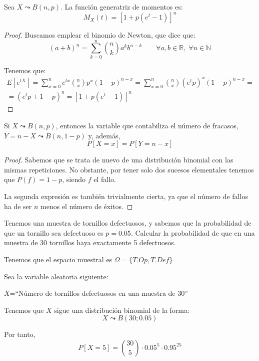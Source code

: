 \begin{prop} Sea $X\leadsto B(n,p)$.
La función generatriz de momentos es:
    $$M_X(t) = [1 + p(e^t - 1)]^n$$
\end{prop}
\begin{proof}
    Buscamos emplear el binomio de Newton, que dice que:
    \begin{equation*}
        (a+b)^n = \sum_{k=0}^n \binom{n}{k} a^kb^{n-k} \qquad \forall a,b\in \mathbb{R}, \;\forall n\in \mathbb{N}
    \end{equation*}

    Tenemos que:
    \begin{multline*}
        E[e^{tX}] = \sum_{x=0}^n e^{tx}\binom{n}{x}p^x(1-p)^{n-x}
        = \sum_{x=0}^n \binom{n}{x}(e^tp)^x(1-p)^{n-x}
        =\\= (e^tp +1-p)^n = [1+p(e^t-1)]^n
    \end{multline*}
\end{proof}


\begin{prop}[Simetría]
    Si $X\leadsto B(n,p)$, entonces la variable que contabiliza el número de fracasos, $Y=n-X \leadsto B(n, 1-p)$ y, además,
    \begin{equation*}
        P[X=x] = P[Y=n-x]
    \end{equation*}
\end{prop}
\begin{proof}
    Sabemos que se trata de nuevo de una distribución binomial con las mismas repeticiones. No obstante, por tener solo dos sucesos elementales tenemos que $P(f)=1-p$, siendo $f$ el fallo.

    La segunda expresión es también trivialmente cierta, ya que el número de fallos ha de ser $n$ menos el número de éxitos.
\end{proof}

\begin{ejemplo}
    Tenemos una muestra de tornillos defectuosos, y sabemos que la probabilidad de que un tornillo sea defectuoso es $p=0.05$. Calcular la probabilidad de que en una muestra de 30 tornillos haya exactamente 5 defectuosos.

    Tenemos que el espacio muestral es $\Omega = \{T.Op, T.Def\}$
    
    Sea la variable aleatoria siguiente:
    \begin{center}
        $X$=``Número de tornillos defectuosos en una muestra de 30''
    \end{center}
    
    Tenemos que $X$ sigue una distribución binomial de la forma:
    \begin{equation*}
        X\leadsto B(30;0.05)
    \end{equation*}
    
    Por tanto,
    \begin{equation*}
        P[X=5] = \binom{30}{5}\cdot 0.05^5 \cdot 0.95^{25}
    \end{equation*}
\end{ejemplo}

